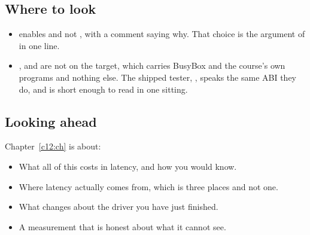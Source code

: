 \subsection*{Where to look}
\begin{itemize}
  \item {} enables  and not ,
    with a comment saying why. That choice is the argument of  in one line.
  \item {},  and  are not on the target, which carries
    BusyBox and the course's own programs and nothing else. The shipped tester,
    , speaks the same ABI they do, and is short enough
    to read in one sitting.
\end{itemize}

\subsection*{Looking ahead}
Chapter~\ref{c12:ch} is about:
\begin{itemize}
  \item What all of this costs in latency, and how you would know.
  \item Where latency actually comes from, which is three places and not one.
  \item What  changes about the driver you have just finished.
  \item A measurement that is honest about what it cannot see.
\end{itemize}
